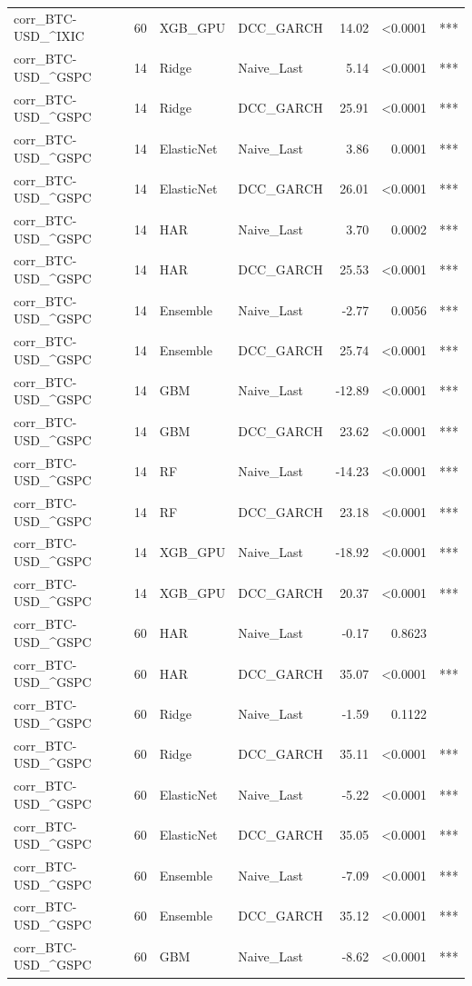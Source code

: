 \begin{table}[H]
\begin{tabular}{llllrrl}
corr_BTC-USD_^IXIC & 60 & XGB_GPU & DCC_GARCH & 14.02 & <0.0001 & *** \\
corr_BTC-USD_^GSPC & 14 & Ridge & Naive_Last & 5.14 & <0.0001 & *** \\
corr_BTC-USD_^GSPC & 14 & Ridge & DCC_GARCH & 25.91 & <0.0001 & *** \\
corr_BTC-USD_^GSPC & 14 & ElasticNet & Naive_Last & 3.86 & 0.0001 & *** \\
corr_BTC-USD_^GSPC & 14 & ElasticNet & DCC_GARCH & 26.01 & <0.0001 & *** \\
corr_BTC-USD_^GSPC & 14 & HAR & Naive_Last & 3.70 & 0.0002 & *** \\
corr_BTC-USD_^GSPC & 14 & HAR & DCC_GARCH & 25.53 & <0.0001 & *** \\
corr_BTC-USD_^GSPC & 14 & Ensemble & Naive_Last & -2.77 & 0.0056 & *** \\
corr_BTC-USD_^GSPC & 14 & Ensemble & DCC_GARCH & 25.74 & <0.0001 & *** \\
corr_BTC-USD_^GSPC & 14 & GBM & Naive_Last & -12.89 & <0.0001 & *** \\
corr_BTC-USD_^GSPC & 14 & GBM & DCC_GARCH & 23.62 & <0.0001 & *** \\
corr_BTC-USD_^GSPC & 14 & RF & Naive_Last & -14.23 & <0.0001 & *** \\
corr_BTC-USD_^GSPC & 14 & RF & DCC_GARCH & 23.18 & <0.0001 & *** \\
corr_BTC-USD_^GSPC & 14 & XGB_GPU & Naive_Last & -18.92 & <0.0001 & *** \\
corr_BTC-USD_^GSPC & 14 & XGB_GPU & DCC_GARCH & 20.37 & <0.0001 & *** \\
corr_BTC-USD_^GSPC & 60 & HAR & Naive_Last & -0.17 & 0.8623 &  \\
corr_BTC-USD_^GSPC & 60 & HAR & DCC_GARCH & 35.07 & <0.0001 & *** \\
corr_BTC-USD_^GSPC & 60 & Ridge & Naive_Last & -1.59 & 0.1122 &  \\
corr_BTC-USD_^GSPC & 60 & Ridge & DCC_GARCH & 35.11 & <0.0001 & *** \\
corr_BTC-USD_^GSPC & 60 & ElasticNet & Naive_Last & -5.22 & <0.0001 & *** \\
corr_BTC-USD_^GSPC & 60 & ElasticNet & DCC_GARCH & 35.05 & <0.0001 & *** \\
corr_BTC-USD_^GSPC & 60 & Ensemble & Naive_Last & -7.09 & <0.0001 & *** \\
corr_BTC-USD_^GSPC & 60 & Ensemble & DCC_GARCH & 35.12 & <0.0001 & *** \\
corr_BTC-USD_^GSPC & 60 & GBM & Naive_Last & -8.62 & <0.0001 & *** \\

\end{tabular}
\end{table}
